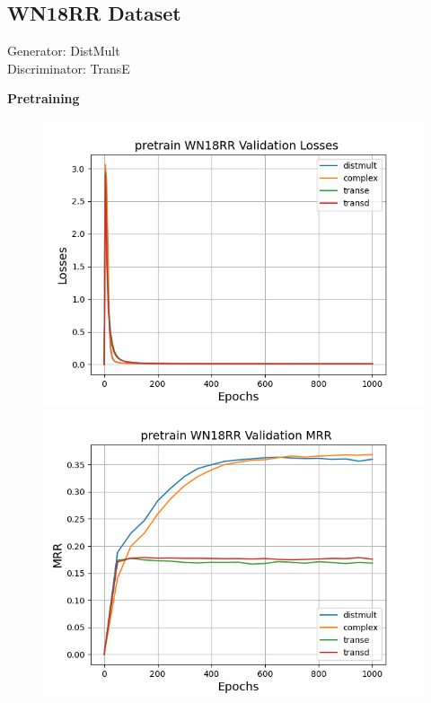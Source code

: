 \subsection{WN18RR Dataset}
Generator: DistMult\\
Discriminator: TransE

\textbf{Pretraining}\\
\begin{figure}
    \centering
    \begin{minipage}{.3\textwidth}
      \centering
      \includegraphics[width=0.9\linewidth]{figures/results/pretrain/wn18rr/pretrain_wn18rr_losses.png}
    \end{minipage}%
    \begin{minipage}{.3\textwidth}
      \centering
      \includegraphics[width=0.9\linewidth]{figures/results/pretrain/wn18rr/pretrain_wn18rr_mrrs.png}
    \end{minipage}

\end{figure}
